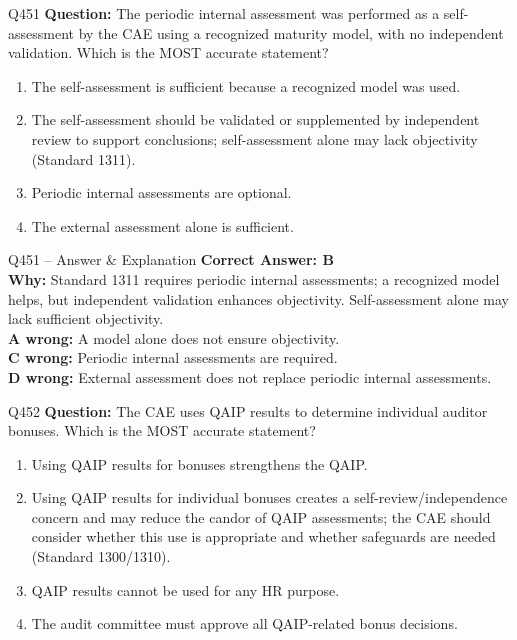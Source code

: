 \documentclass[aspectratio=169,10pt]{beamer}
\begin{document}
	\begin{frame}[t]{Q451}
		\small
		\textbf{Question:} The periodic internal assessment was performed as a self-assessment by the CAE using a recognized maturity model, with no independent validation. Which is the MOST accurate statement?
		\begin{enumerate}[label=\Alph*.,itemsep=1pt,topsep=2pt]
			\item The self-assessment is sufficient because a recognized model was used.
			\item The self-assessment should be validated or supplemented by independent review to support conclusions; self-assessment alone may lack objectivity (Standard 1311).
			\item Periodic internal assessments are optional.
			\item The external assessment alone is sufficient.
		\end{enumerate}
	\end{frame}
	
	\begin{frame}[t]{Q451 -- Answer \& Explanation}
		\small
		\textbf{Correct Answer: B} \\[4pt]
		\textbf{Why:} Standard 1311 requires periodic internal assessments; a recognized model helps, but independent validation enhances objectivity. Self-assessment alone may lack sufficient objectivity. \\[4pt]
		\textbf{A wrong:} A model alone does not ensure objectivity. \\[2pt]
		\textbf{C wrong:} Periodic internal assessments are required. \\[2pt]
		\textbf{D wrong:} External assessment does not replace periodic internal assessments.
	\end{frame}
	
	\begin{frame}[t]{Q452}
		\small
		\textbf{Question:} The CAE uses QAIP results to determine individual auditor bonuses. Which is the MOST accurate statement?
		\begin{enumerate}[label=\Alph*.,itemsep=1pt,topsep=2pt]
			\item Using QAIP results for bonuses strengthens the QAIP.
			\item Using QAIP results for individual bonuses creates a self-review/independence concern and may reduce the candor of QAIP assessments; the CAE should consider whether this use is appropriate and whether safeguards are needed (Standard 1300/1310).
			\item QAIP results cannot be used for any HR purpose.
			\item The audit committee must approve all QAIP-related bonus decisions.
		\end{enumerate}
	\end{frame}
	
\end{document}
